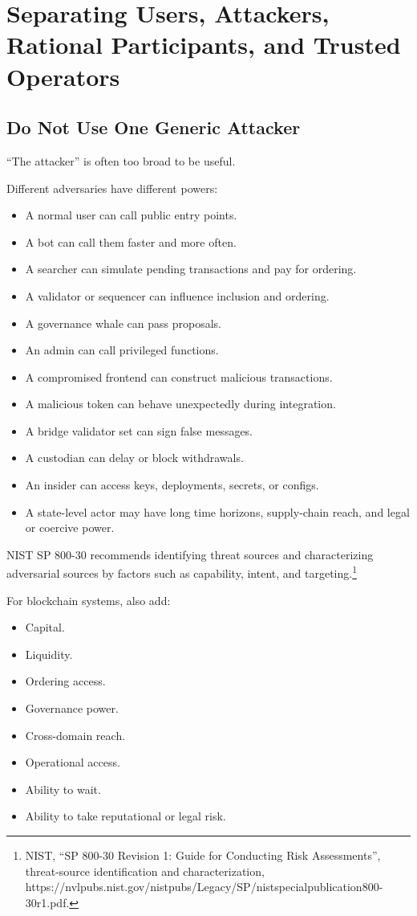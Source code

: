 \section{Separating Users, Attackers, Rational Participants, and Trusted Operators}

\subsection{Do Not Use One Generic Attacker}

``The attacker'' is often too broad to be useful.

Different adversaries have different powers:

\begin{itemize}
\tightlist
\item
  A normal user can call public entry points.
\item
  A bot can call them faster and more often.
\item
  A searcher can simulate pending transactions and pay for ordering.
\item
  A validator or sequencer can influence inclusion and ordering.
\item
  A governance whale can pass proposals.
\item
  An admin can call privileged functions.
\item
  A compromised frontend can construct malicious transactions.
\item
  A malicious token can behave unexpectedly during integration.
\item
  A bridge validator set can sign false messages.
\item
  A custodian can delay or block withdrawals.
\item
  An insider can access keys, deployments, secrets, or configs.
\item
  A state-level actor may have long time horizons, supply-chain reach,
  and legal or coercive power.
\end{itemize}

NIST SP 800-30 recommends identifying threat sources and characterizing
adversarial sources by factors such as capability, intent, and
targeting.\footnote{NIST, ``SP 800-30 Revision 1: Guide for Conducting
  Risk Assessments'', threat-source identification and characterization,
  https://nvlpubs.nist.gov/nistpubs/Legacy/SP/nistspecialpublication800-30r1.pdf.}

For blockchain systems, also add:

\begin{itemize}
\tightlist
\item
  Capital.
\item
  Liquidity.
\item
  Ordering access.
\item
  Governance power.
\item
  Cross-domain reach.
\item
  Operational access.
\item
  Ability to wait.
\item
  Ability to take reputational or legal risk.
\end{itemize}

